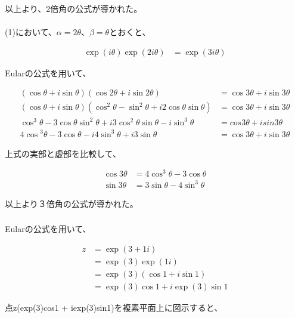 \documentclass[dvipdfmx,a4paper]{jsarticle}
\begin{document}
以上より、2倍角の公式が導かれた。\\
\\

(1)において、$\alpha = 2\theta$、$\beta = \theta$とおくと、

\begin{align*}
\exp{(i\theta)} \exp{(2i\theta)} &= \exp{(3i\theta)}
\end{align*}

Eularの公式を用いて、

\begin{align*}
(\cos{\theta} + i\sin{\theta})(\cos{2\theta} +i\sin{2\theta}) &= \cos{3\theta} + i\sin{3\theta} \\
(\cos{\theta} + i\sin{\theta})(\cos^{2}\theta - \sin^{2}\theta + i2\cos{\theta} \sin{\theta})&= \cos{3\theta} + i\sin{3\theta}\\
\cos^{3}\theta - 3\cos{\theta} \sin^{2}\theta +i3\cos^{2}\theta \sin{\theta} - i\sin^{3}\theta &= cos3\theta + isin3\theta\\
4\cos{^3}\theta - 3\cos{\theta} - i4\sin^{3}\theta + i3\sin{\theta} &= \cos{3\theta} + i\sin{3\theta}
\end{align*}

上式の実部と虚部を比較して、

\begin{align*}
\cos{3\theta} &= 4\cos^{3}\theta - 3\cos{\theta}\\
\sin{3\theta} &= 3\sin{\theta} - 4\sin^{3}\theta
\end{align*}

以上より３倍角の公式が導かれた。\\

\subsubsection{}

Eularの公式を用いて、

\begin{align*}
z &= \exp{(3+ 1i)}\\
&= \exp{(3)}\exp{(1i)} \\
&= \exp{(3)} (\cos{1} + i\sin{1})\\
&= \exp{(3)}\cos{1} + i\exp{(3)}\sin{1}
\end{align*}

点z(exp(3)cos1 + iexp(3)sin1)を複素平面上に図示すると、\\

\end{document}
